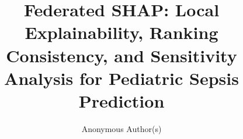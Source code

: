 \documentclass[sigconf,review,anonymous]{acmart}
\begin{document}
\title[Federated SHAP for Pediatric Sepsis Prediction]{Federated SHAP: Local Explainability, Ranking Consistency, and Sensitivity Analysis for Pediatric Sepsis Prediction}

\author{Anonymous Author(s)}
\email{}

\renewcommand{\shortauthors}{Anonymous Author(s)}

%
%
\end{document}
